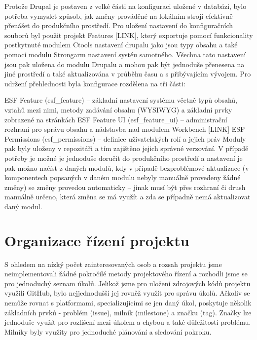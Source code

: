 \documentclass[11pt,draft,oneside]{fithesis2}
\begin{document}
Protože Drupal je postaven z velké části na konfiguraci uložené v databázi, bylo potřeba vymyslet způsob, jak změny prováděné na lokálním stroji efektivně přenášet do produkčního prostředí. Pro uložení nastavení do konfiguračních souborů byl použit projekt Features [LINK], který exportuje pomocí funkcionality postkytnuté modulem Ctools nastavení drupalu jako jsou typy obsahu a také pomocí modulu Strongarm nastavení systéu samotného. Všechna tato nastavení jsou pak uložena do modulu Drupalu a mohou pak být jednoduše přenesena na jiné prostředí a také aktualizována v průběhu času a s přibývajícím vývojem. Pro udržení přehlednosti byla konfigurace rozdělena na tři části:

ESF Feature (esf\_feature) – základní nastavení systému včetně typů obsahů, vztahů mezi nimi, metody zadávání obsahu (WYSIWYG) a základní prvky zobrazené na stránkách
ESF Feature UI (esf\_feature\_ui) – administrační rozhraní pro správu obsahu a nádstavba nad modulem Workbench [LINK]
ESF Permissions (esf\_permissions) – definice uživatelských rolí a jejich práv
Moduly pak byly uloženy v repozitáři a tím zajištěno jejich správné verzování. V případě potřeby je možné je jednoduše doručit do produkčního prostředí a nastavení je pak možno načíst z daných modulů, kdy v případě bezproblémové aktualizace (v komponentech popsaných v daném modulu nebyly manuálně provedeny žádné změny) se změny provedou automaticky – jinak musí být přes rozhraní či drush manuálně určeno, která změna se má využít a zda se případně nemá aktualizovat daný modul.

\section{Organizace řízení projektu}
S ohledem na nízký počet zainteresovaných osob a rozsah projektu jsme neimplementovali žádné pokročilé metody projektového řízení a rozhodli jsme se pro jednoduchý seznam úkolů. Jelikož jsme pro uložení zdrojových kódů projektu využili GitHub, bylo nejjednodušší jej rovněž využít pro správu úkolů. Ačkoliv se nemůže rovnat s platformami, specializujícími se jen daný úkol, poskytuje několik základních prvků - problém (issue), milník (milestone) a značku (tag). Značky lze jednoduše využít pro rozlišení mezi úkolem a chybou a také důležitostí problému. Milníky byly využity pro jednoduché plánování a sledování pokroku.
\end{document}
